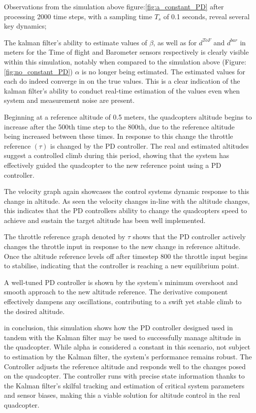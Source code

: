 \documentclass{article}
\begin{document}
Observations from the simulation above figure:\ref{fig:a_constant_PD} after
processing 2000 time steps, with a sampling time \(T_s\) of 0.1 seconds, reveal
several key dynamics;

The kalman filter’s ability to estimate values of \(\beta\), as well as for
\(d^{ToF}\) and \(d^{bar}\) in meters for the Time of flight and Barometer
sensors respectively is clearly visible within this simulation, notably when
compared to the simulation above (Figure:\ref{fig:no_constant_PD}) \(\alpha\) is
no longer being estimated. The estimated values for each do indeed converge in
on the true values. This is a clear indication of the kalman filter’s ability to
conduct real-time estimation of the values even when system and measurement
noise are present.

Beginning at a reference altitude of 0.5 meters, the quadcopters altitude begins
to increase after the 500th time step to the 800th, due to the reference
altitude being increased between these times. In response to this change the
throttle reference \((\tau)\) is changed by the PD controller. The real and
estimated altitudes suggest a controlled climb during this period, showing that
the system has effectively guided the quadcopter to the new reference point
using a PD controller.

The velocity graph again showcases the control systems dynamic response to this
change in altitude. As seen the velocity changes in-line with the altitude
changes, this indicates that the PD controllers ability to change the
quadcopters speed to achieve and sustain the target altitude has been well
implemented.

The throttle reference graph denoted by \(\tau\) shows that the PD controller
actively changes the throttle input in response to the new change in reference
altitude. Once the altitude reference levels off after timestep 800 the throttle
input begins to stabilise, indicating that the controller is reaching a new
equilibrium point.
 
A well-tuned PD controller is shown by the system's minimum overshoot and smooth
approach to the new altitude reference. The derivative component effectively
dampens any oscillations, contributing to a swift yet stable climb to the
desired altitude.

in conclusion, this simulation shows how the PD controller designed used in
tandem with the Kalman filter may be used to successfully manage altitude in the
quadcopter. While alpha is considered a constant in this scenario, not subject
to estimation by the Kalman filter, the system's performance remains robust. The
Controller adjusts the reference altitude and responds well to the changes posed
on the quadcopter. The controller runs with precise state information thanks to
the Kalman filter's skilful tracking and estimation of critical system
parameters and sensor biases, making this a viable solution for altitude control
in the real quadcopter.
\end{document}
